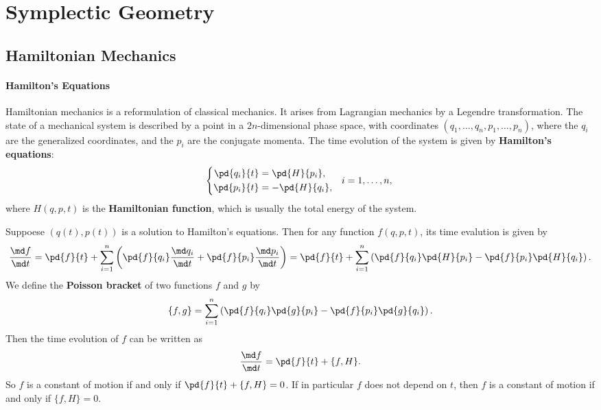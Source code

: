 \chapter{Symplectic Geometry}
\label{chap:SymplecticGeometry}
\section{Hamiltonian Mechanics}
\subsubsection*{Hamilton's Equations}
Hamiltonian mechanics is a reformulation of classical mechanics. 
It arises from Lagrangian mechanics by a Legendre transformation. 
The state of a mechanical system is described by a point in a 
$2n$-dimensional phase space, with coordinates $(q_1,\ldots,q_n,
p_1,\ldots,p_n)$, where the $q_i$ are the generalized coordinates,
and the $p_i$ are the conjugate momenta. The time evolution of the
system is given by \textbf{Hamilton's equations}:
\begin{equation*}
    \left\{
    \begin{aligned}
        \pd{q_i}{t} &= \pd{H}{p_i}, \\
        \pd{p_i}{t} &= -\pd{H}{q_i},
    \end{aligned}
    \quad i=1,\ldots,n,\right.
\end{equation*}
where $H(q,p,t)$ is the \textbf{Hamiltonian function}, which is usually the
total energy of the system.

Suppoese $(q(t),p(t))$ is a solution to Hamilton's equations. 
Then for any function $f(q,p,t)$, its time evalution is given by 
\begin{equation*}
    \frac{\md f}{\md t} = \pd{f}{t} + \sum_{i=1}^n\left(
    \pd{f}{q_i}\frac{\md q_i}{\md t} + 
    \pd{f}{p_i}\frac{\md p_i}{\md t}\right)
    = \pd{f}{t} + \sum_{i=1}^{n}\left(\pd{f}{q_i}\pd{H}{p_i} 
    - \pd{f}{p_i}\pd{H}{q_i}\right).
\end{equation*}
We define the \textbf{Poisson bracket} of two functions $f$ and $g$ by
\begin{equation*}
    \{f,g\} = \sum_{i=1}^{n}\left(\pd{f}{q_i}\pd{g}{p_i} 
    - \pd{f}{p_i}\pd{g}{q_i}\right).
\end{equation*}
Then the time evolution of $f$ can be written as 
\begin{equation*}
    \frac{\md f}{\md t} = \pd{f}{t} + \{f,H\}.
\end{equation*}
So $f$ is a constant of motion if and only if $\pd{f}{t} + \{f,H\} = 0$. 
If in particular $f$ does not depend on $t$, then $f$ is a constant of 
motion if and only if $\{f,H\} = 0$. 

